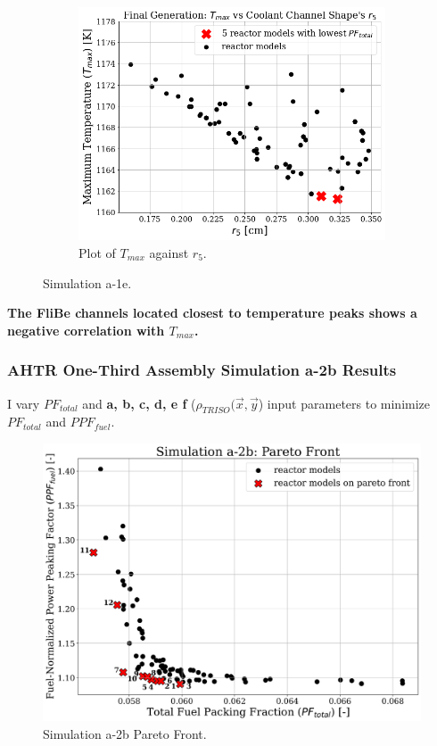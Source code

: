 \begin{frame}
\begin{figure}
\begin{subfigure}{0.3\textwidth}
        \end{subfigure}
        \begin{subfigure}{0.3\textwidth}
            \includegraphics[width=\linewidth]{../docs/figures/a-1e-r5.png}
            \caption{Plot of $T_{max}$ against $r_5$.}
            \label{fig:a-1e-r5} 
        \end{subfigure}
        \caption{Simulation a-1e.}
    \end{figure}
    
    \textbf{The FliBe channels located closest to temperature peaks shows a negative 
    correlation with $T_{max}$.}
\end{frame}

\begin{frame}
    \frametitle{AHTR One-Third Assembly Simulation a-2b Results}
    I vary $PF_{total}$ and \textbf{a, b, c, d, e f} ($\rho_{TRISO}(\vec{x}, \vec{y}$)
    input parameters to minimize $PF_{total}$ and $PPF_{fuel}$. 
    \begin{figure}
        \includegraphics[width=0.8\linewidth]{../docs/figures/assem-obj-2-pfppf-pareto.png} 
        \caption{Simulation a-2b Pareto Front.}
    \end{figure}
\end{frame}

